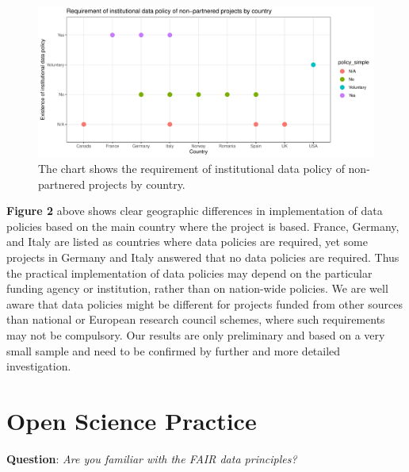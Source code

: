 \documentclass[
  12pt,
]{scrreprt}
\begin{document}
\footnotesize

\normalsize

\footnotesize

\begin{figure}

{\centering \includegraphics{01_FAIR_epi_report_files/figure-latex/unnamed-chunk-37-1} 

}

\caption{The chart shows the requirement of institutional data policy of non-partnered projects by country.}\label{fig:unnamed-chunk-37}
\end{figure}

\normalsize

\newpage

\textbf{Figure 2} above shows clear geographic differences in
implementation of data policies based on the main country where the
project is based. France, Germany, and Italy are listed as countries
where data policies are required, yet some projects in Germany and Italy
answered that no data policies are required. Thus the practical
implementation of data policies may depend on the particular funding
agency or institution, rather than on nation-wide policies. We are well
aware that data policies might be different for projects funded from
other sources than national or European research council schemes, where
such requirements may not be compulsory. Our results are only
preliminary and based on a very small sample and need to be confirmed by
further and more detailed investigation.

\hypertarget{open-science-practice-1}{%
\section{Open Science Practice}\label{open-science-practice-1}}

\textbf{Question}: \emph{Are you familiar with the FAIR data
principles?}
\end{document}
